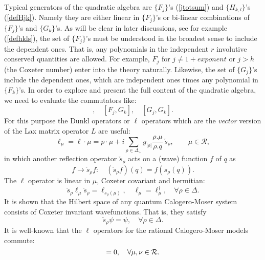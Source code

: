 \documentclass[a4paper,12pt]{article}
\begin{document}
Typical generators of the quadratic algebra are $\{F_j\}$'s
(\ref{jtotsum}) and
$\{H_{k,l}\}$'s (\ref{defHjk}).  Namely they are either linear in
$\{F_j\}$'s or bi-linear combinations of $\{F_j\}$'s and $\{G_k\}$'s.
As will be clear in later discussions, see for example (\ref{defhkls}),
the set of $\{F_j\}$'s must be understood in the broadest sense to
include the dependent ones. That is, any polynomials in the independent
$r$ involutive conserved quantities are allowed. For example, $F_j$ for
$j\neq 1+exponent$ or  $j>h$ (the Coxeter number) enter into
the theory naturally. Likewise, the set of $\{G_j\}$'s include
the dependent ones, which are independent ones times any
polynomial in $\{F_k\}$'s. In order to explore and present the
full content of the quadratic algebra, we need to evaluate the
commutators like:
\begin{equation}
[F_j,F_k],\quad [F_j,G_k],\quad [G_j,G_k].
\label{3coms}
\end{equation}
For this purpose the Dunkl operators \cite{Dunk} or $\ell$ operators
which are the {\em vector} version of the Lax matrix operator $L$
\cite{kps} are useful:
\begin{equation}
  \ell_\mu=\ell\!\cdot\!\mu=p\cdot\!\mu +
  i\sum_{\rho\in\Delta_+}g_{|\rho|}
\frac{\rho.\mu}{\rho.q}\,\check{s}_\rho,
  \qquad \mu\in{\mathcal R},
\label{ldef}
\end{equation}
in which another reflection operator $\check{s}_{\rho}$ acts on a (wave)
function $f$ of $q$ as
\begin{equation}
f\to \check{s}_{\rho}f: \quad  (\check{s}_{\rho}f)(q)=f(s_{\rho}(q)).
\label{scdef}
\end{equation}
The $\ell$ operator is  linear in \(\mu\),  Coxeter covariant
and hermitian:
\begin{equation}
   \check{s}_{\rho}\ell_{\mu}\check{s}_{\rho}=\ell_{s_{\rho}(\mu)},\quad
   \ell_{\mu}=\ell_{\mu}^\dagger, \quad \forall \rho\in\Delta.
\end{equation}
It is shown \cite{kps} that the Hilbert space of any quantum Calogero-Moser
system consists of Coxeter invariant wavefunctions. That is, they satisfy
\begin{equation}
\check{s}_{\rho}\psi=\psi,\quad \forall\rho\in\Delta.
\label{coxinv}
\end{equation}
It is well-known that the $\ell$ operators for the rational
Calogero-Moser models commute:
\begin{equation}
[\ell_\mu,\ell_\nu]=0,\quad \forall \mu,\nu\in{\cal R}.
\label{lcomm}
\end{equation}
\end{document}
